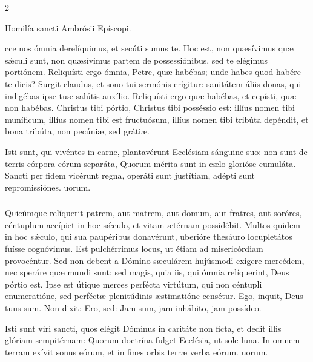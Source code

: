 \documentclass[9pt,twoside]{extarticle}
\begin{document}
\begin{multicols}{2}
\begin{center}Homilía sancti Ambrósii Epíscopi.\\
\end{center}
cce nos ómnia derelíquimus, et secúti sumus te. Hoc est, non quæsívimus quæ sǽculi sunt, non quæsívimus partem de possessiónibus, sed te elégimus portiónem. Reliquísti ergo ómnia, Petre, quæ habébas; unde habes quod habére te dicis? Surgit claudus, et sono tui sermónis erígitur: sanitátem áliis donas, qui indigébas ipse tuæ salútis auxílio. Reliquísti ergo quæ habébas, et cepísti, quæ non habébas. Christus tibi pórtio, Christus tibi posséssio est: illíus nomen tibi muníficum, illíus nomen tibi est fructuósum, illíus nomen tibi tribúta depéndit, et bona tribúta, non pecúniæ, sed grátiæ.

\begin{tightlist}{}
\item {} Isti sunt, qui vivéntes in carne, plantavérunt Ecclésiam sánguine suo: non sunt de terris córpora eórum separáta, \textred{*} Quorum mérita sunt in cælo glorióse cumuláta.  Sancti per fidem vicérunt regna, operáti sunt justítiam, adépti sunt repromissiónes. uorum.
\end{tightlist}

\subsubsection*{\center {}}
\lettrine{Q}uicúmque relíquerit patrem, aut matrem, aut domum, aut fratres, aut soróres, céntuplum accípiet in hoc sǽculo, et vitam ætérnam possidébit. Multos quidem in hoc sǽculo, qui sua paupéribus donavérunt, uberióre thesáuro locupletátos fuísse cognóvimus. Est pulchérrimus locus, ut étiam ad misericórdiam provocéntur. Sed non debent a Dómino sæculárem hujúsmodi exígere mercédem, nec speráre quæ mundi sunt; sed magis, quia iis, qui ómnia relíquerint, Deus pórtio est. Ipse est útique merces perfécta virtútum, qui non céntupli enumeratióne, sed perféctæ plenitúdinis æstimatióne censétur. Ego, inquit, Deus tuus sum. Non dixit: Ero, sed: Jam sum, jam inhábito, jam possídeo.

\begin{tightlist}{}
\item {} Isti sunt viri sancti, quos elégit Dóminus in caritáte non ficta, et dedit illis glóriam sempitérnam: \textred{*} Quorum doctrína fulget Ecclésia, ut sole luna.  In omnem terram exívit sonus eórum, et in fines orbis terræ verba eórum. uorum.
\end{tightlist}


\end{multicols}
\end{document}
